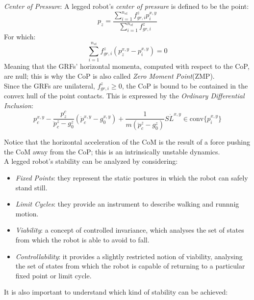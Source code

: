 \begin{definition}\label{legged_robotics_Center_of_pressure}
    \textit{Center of Pressure}: A legged robot's \textit{center of pressure} is defined to be the point:
    \begin{equation}\label{legged_robotics_Center_of_pressure_equation}
        p_z=\frac{\sum_{i=1}^{n_{st}}f_{gr,i}^{z}p_{i}^{x,y}}{\sum_{i=1}^{n_{st}}f_{gr,i}^{z}}
    \end{equation}
    For which:
    \begin{equation*}
        \sum_{i=1}^{n_{st}}f_{gr,i}^{z}(p_z^{x,y}-p_{i}^{x,y})=0
    \end{equation*}
    Meaning that the  GRFs' horizontal momenta, computed with respect to the CoP, are null; this is why the CoP is also called \textit{Zero Moment Point}(ZMP).\\
    Since the GRFs are unilateral, $f_{gr,i}^{z}\geq0$, the CoP is bound to be contained in the convex hull of the point contacts. This is expressed by the \textit{Ordinary Differential Inclusion}:
    \begin{equation}\label{legged_robotics_CoP_ODI}
        p_c^{x,y}-\frac{p_z^c}{\ddot{p}_c^z-g_0^z}(\ddot{p}_c^{x,y}-g_0^{x,y})+\frac{1}{m(\ddot{p}_c^z-g_0^z)}S\dot{L}^{x,y}\in \text{conv}\{p_{i}^{x,y}\}
    \end{equation}
\end{definition}
Notice that the horizontal acceleration of the CoM is the result of a force pushing the CoM away from the CoP; this is an intrinsically unstable dynamics. \\
A legged robot's stability can be analyzed by considering:
\begin{itemize}
    \item \textit{Fixed Points}: they represent the static postures in which the robot can safely stand still.
    \item \textit{Limit Cycles}: they provide an instrument to describe walking and runnnig motion.
    \item \textit{Viability}: a concept of controlled invariance, which analyses the set of states from which the robot is able to avoid to fall.
    \item \textit{Controllability}: it provides a slightly restricted notion of viability, analysing the set of states from which the robot is capable of returning to a particular fixed point or limit cycle.
\end{itemize}
It is also important to understand which kind of stability can be achieved:
